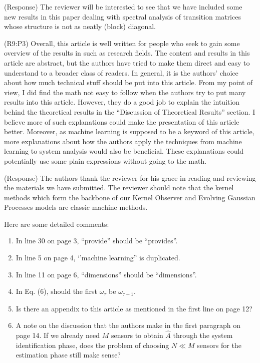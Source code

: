 \documentclass{letter}
\begin{document}
{\color{red}(Response)} The reviewer will be interested to see that we have included some new results in this paper dealing with spectral analysis of transition matrices whose structure is not as neatly (block) diagonal.

{\color{red}(R9:P3)} Overall, this article is well written for people who seek to gain some overview of the results in such as research fields. The content and results in this article are abstract, but the authors have tried to make them direct and easy to understand to a broader class of readers. In general, it is the authors’ choice about how much technical stuff should be put into this article. From my point of view, I did find the math not easy to follow when the authors try to put many results into this article. However, they do a good job to explain the intuition behind the theoretical results in the “Discussion of Theoretical Results” section. I believe more of such explanations could make the presentation of this article better. Moreover, as machine learning is supposed to be a keyword of this article, more explanations about how the authors apply the techniques from machine learning to system analysis would also be beneficial. These explanations could potentially use some plain expressions without going to the math.

{\color{red}(Response)} The authors thank the reviewer for his grace in reading and reviewing the materials we have submitted. The reviewer should note that the kernel methods which form the backbone of our Kernel Observer and Evolving Gaussian Processes models are classic machine methods.

Here are some detailed comments:
\begin{enumerate}[(1)]
	\item In line 30 on page 3, “provide” should be “provides”.
	\item In line 5 on page 4, ‘’machine learning” is duplicated.
	\item In line 11 on page 6, “dimensions” should be “dimensions”.
	\item In Eq. (6), should the first $\omega_{\tau}$ be $\omega_{\tau+1}$.
	\item Is there an appendix to this article as mentioned in the first line on page 12?
	\item A note on the discussion that the authors make in the first paragraph on page 14. If we already need $M$ sensors to obtain $\hat{A}$ through the system identification phase, does the problem of choosing $N\ll M$ sensors for the estimation phase still make sense?
\end{enumerate}
\end{document}
